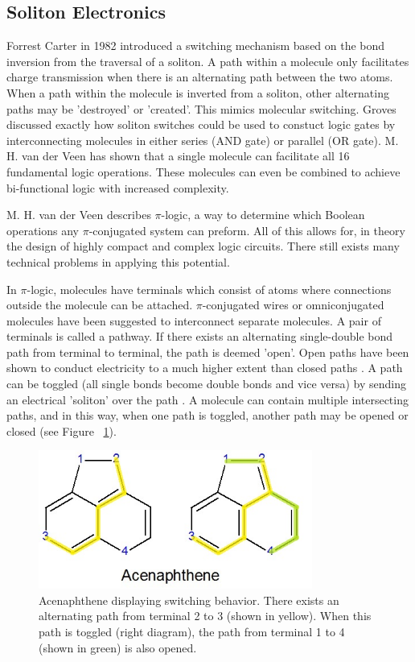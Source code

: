 \documentclass[12pt]{article}
\begin{document}
\subsection{Soliton Electronics}

Forrest Carter in 1982 introduced a switching mechanism based on the bond inversion from the traversal of a soliton. A path within a molecule only  facilitates charge transmission when there is an alternating path between the two atoms. When a path within the molecule is inverted from a soliton, other alternating paths may be 'destroyed' or 'created'. This mimics molecular switching.  Groves discussed exactly how soliton switches could be used to constuct logic gates by interconnecting molecules in either series (AND gate) or parallel (OR gate). M. H.  van der Veen \cite{v06} has shown that a single molecule can facilitate all 16 fundamental logic operations. These molecules can even be combined to achieve bi-functional logic with increased complexity.

M. H. van der Veen \cite{v06} describes $\pi$-logic, a way to determine which Boolean operations any $\pi$-conjugated system can preform. All of this allows for, in theory the design of highly compact and complex logic circuits. There still exists many technical problems in applying this potential.

In $\pi$-logic, molecules have terminals which consist of atoms where connections outside the molecule can be attached. $\pi$-conjugated wires \cite{9} or omniconjugated molecules \cite{OmniConj} have been suggested to interconnect separate molecules. A pair of terminals is called a pathway. If there exists an alternating single-double bond path from terminal to terminal, the path is deemed 'open'. Open paths have been shown to conduct electricity to a much higher extent than closed paths \cite{openPath}. A path can be toggled (all single bonds become double bonds and vice versa) by sending an electrical 'soliton' over the path \cite{HK88}. A molecule can contain multiple intersecting paths, and in this way, when one path is toggled, another path may be opened or closed (see Figure ~\ref{fig:acenaptheneHighlighted}).

\begin{figure}[ht!]
\centering
\includegraphics[width=90mm]{AcenaphtheneHighlighted.jpg}
\caption{Acenaphthene displaying switching behavior. There exists an alternating path from terminal 2 to 3 (shown in yellow). When this path is toggled (right diagram), the path from terminal 1 to 4 (shown in green) is also opened.}
\label{fig:acenaptheneHighlighted}
\end{figure}
\end{document}
